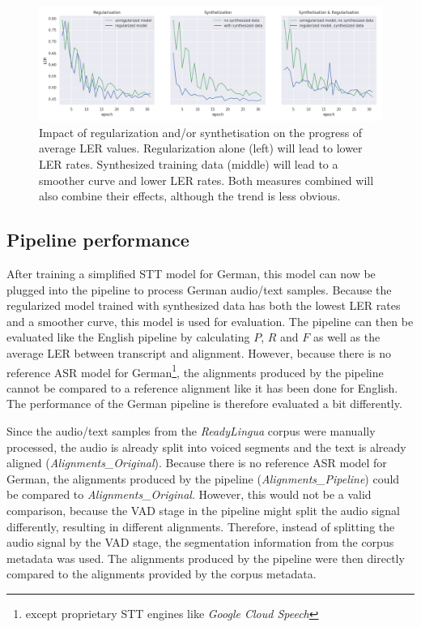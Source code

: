 \begin{figure}[h!]
	\includegraphics[width=\linewidth]{./img/regularization_synthetisation.png}
	\caption{Impact of regularization and/or synthetisation on the progress of average \ac{LER} values. Regularization alone (left) will lead to lower \ac{LER} rates. Synthesized training data (middle) will lead to a smoother curve and lower \ac{LER} rates. Both measures combined will also combine their effects, although the trend is less obvious.}
	\label{regularization_synthetisation}
\end{figure}

\subsection{Pipeline performance}

After training a simplified \ac{STT} model for German, this model can now be plugged into the pipeline to process German audio/text samples. Because the regularized model trained with synthesized data has both the lowest \ac{LER} rates and a smoother curve, this model is used for evaluation. The pipeline can then be evaluated like the English pipeline by calculating $P$, $R$ and $F$ as well as the average \ac{LER} between transcript and alignment. However, because there is no reference \ac{ASR} model for German\footnote{except proprietary \ac{STT} engines like \textit{Google Cloud Speech}}, the alignments produced by the pipeline cannot be compared to a reference alignment like it has been done for English. The performance of the German pipeline is therefore evaluated a bit differently.

Since the audio/text samples from the \textit{ReadyLingua} corpus were manually processed, the audio is already split into voiced segments and the text is already aligned (\textit{Alignments\_Original}). Because there is no reference \ac{ASR} model for German, the alignments produced by the pipeline (\textit{Alignments\_Pipeline}) could be compared to \textit{Alignments\_Original}. However, this would not be a valid comparison, because the \ac{VAD} stage in the pipeline might split the audio signal differently, resulting in different alignments. Therefore, instead of splitting the audio signal by the \ac{VAD} stage, the segmentation information from the corpus metadata was used. The alignments produced by the pipeline were then directly compared to the alignments provided by the corpus metadata.

